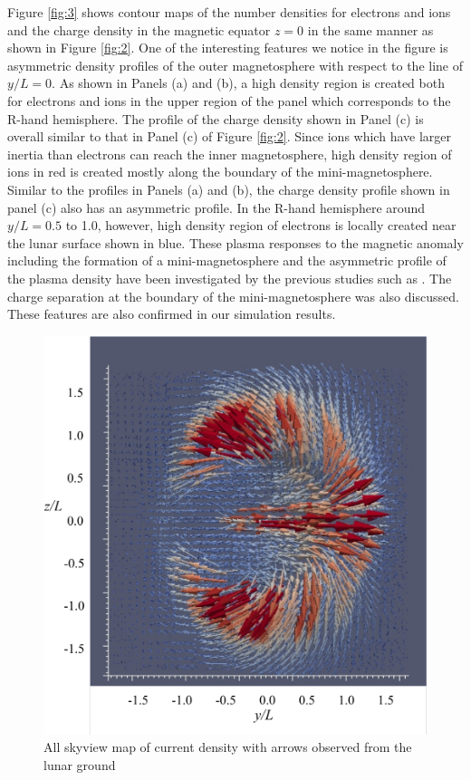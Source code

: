 \documentclass[draft,jgrga]{agutex2015}
\begin{document}
\begin{article}
Figure \ref{fig:3} shows contour maps of the number densities 
for electrons and ions and the charge density in the magnetic equator $z=0$ 
in the same manner as shown in Figure \ref{fig:2}. 
One of the interesting features we notice in the figure is 
asymmetric density profiles of the outer magnetosphere 
with respect to the line of $y/L =0$.
As shown in Panels (a) and (b), a high density region is created 
both for electrons and ions in the upper region of the panel
which corresponds to the R-hand hemisphere. 
The profile of the charge density shown in Panel (c) is overall 
similar to that in Panel (c) of Figure \ref{fig:2}. 
Since ions which have larger inertia than electrons can reach the inner magnetosphere, 
high density region of ions in red is created mostly 
along the boundary of the mini-magnetosphere. 
Similar to the profiles in Panels (a) and (b), 
the charge density profile shown in panel (c) also has an asymmetric profile. 
In the R-hand hemisphere around $y/L = 0.5$ to 1.0, however, 
high density region of electrons is locally created near the lunar surface shown in blue. 
These plasma responses to the magnetic anomaly 
including the formation of a mini-magnetosphere and 
the asymmetric profile of the plasma density have been investigated 
by the previous studies such as
\citep[e.g.][]{Harnett2002,Kallio2012,Poppe2012a,Deca2014,Deca2015}.
The charge separation at the boundary of the mini-magnetosphere was also discussed.
These features are also confirmed in our simulation results.


\begin{figure}[h]
\centering
\noindent\includegraphics[width=12cm]{./figures/Fig_4_bb-crop.pdf}
\caption{All skyview map of current density with arrows 
observed from the lunar ground}\label{fig:4}
\end{figure}


\end{article}
\end{document}
